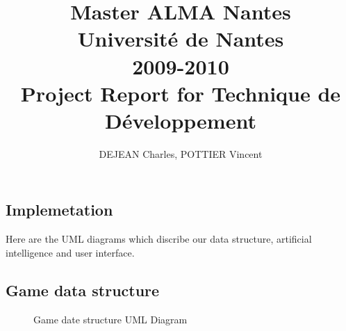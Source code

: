 \documentclass[12pt,a4paper,utf8x]{report}
\title
{
	\normalsize{Master ALMA Nantes\\
	Université de Nantes\\
	2009-2010}\\
	\vspace{15mm}
	\Huge{Project Report for Technique de Développement}
}
\author{DEJEAN Charles, POTTIER Vincent\\
	\vspace{45mm}
}
\begin{document}
\maketitle

%

\tableofcontents
\clearpage

\begin{onehalfspace}

\chapter{Implemetation}

	Here are the UML diagrams which discribe our data structure, artificial intelligence and user interface.

	\section{Game data structure}

	\begin{figure}[!]
  		\begin{center}
  		\end{center}
		\caption{Game date structure UML Diagram}
	\end{figure}


\end{onehalfspace}
\end{document}
